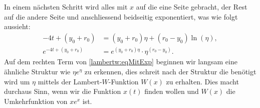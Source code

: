In einem nächsten Schritt wird alles mit \(x\) auf die eine Seite gebracht, der Rest auf die andere Seite und anschliessend beidseitig exponentiert, was wie folgt aussieht:
\begin{align}
	-4t+\left(y_0+r_0\right)
	&=
	\left(y_0+r_0\right)\eta+\left(r_0-y_0\right)\operatorname{ln}\left(\eta\right), \\
	e^{\displaystyle -4t+\left(y_0+r_0\right)}
	&=
	e^{\displaystyle \left(y_0+r_0\right)\eta}\cdot\eta^{\displaystyle \left(r_0-y_0\right)}.
	\label{lambertw:eqMitExp}
\end{align}
Auf dem rechten Term von \eqref{lambertw:eqMitExp} beginnen wir langsam eine ähnliche Struktur wie \(\eta e^\eta\) zu erkennen, dies schreit nach der Struktur die benötigt wird um \(\eta\) mittels der Lambert-\(W\)-Funktion \(W(x)\) zu erhalten. Dies macht durchaus Sinn, wenn wir die Funktion \(x(t)\) finden wollen und \(W(x)\) die Umkehrfunktion von \(x e^x\) ist. 

